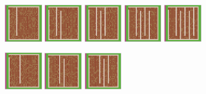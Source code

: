 \documentclass[12pt,letterpaper]{article}
\begin{document}
\begin{figure}[!ht]
\begin{minipage}[b]{\linewidth}
  \end{minipage}
  \begin{minipage}[b]{\linewidth}
    \includegraphics[width=0.15\textwidth]{./figures/chokepoint_2_a.png}
    \includegraphics[width=0.15\textwidth]{./figures/chokepoint_2_b.png}
    \includegraphics[width=0.15\textwidth]{./figures/chokepoint_2_c.png}
    \includegraphics[width=0.15\textwidth]{./figures/chokepoint_2_d.png}
    \includegraphics[width=0.15\textwidth]{./figures/chokepoint_2_e.png}
  \end{minipage}
  \begin{minipage}[b]{\linewidth}
    \includegraphics[width=0.15\textwidth]{./figures/chokepoint_3_a.png}
    \includegraphics[width=0.15\textwidth]{./figures/chokepoint_3_b.png}
    \includegraphics[width=0.15\textwidth]{./figures/chokepoint_3_c.png}

\end{minipage}
\end{figure}
\end{document}
